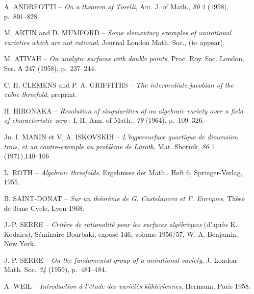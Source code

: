\documentclass[10pt]{article}
\begin{document}
\begin{enumerate}[label={\textup{[\arabic*]}},leftmargin=3.2em,labelsep=0.75em,itemsep=0.38em]
  \item A. ANDREOTTI -- \emph{On a theorem of Torelli}, Am. J. of Math., \emph{80} 4 (1958), p.~801--828.
  \item M. ARTIN and D. MUMFORD -- \emph{Some elementary examples of unirational varieties which are not rational}, Journal London Math. Soc., (to appear).
  \item M. ATIYAH -- \emph{On analytic surfaces with double points}, Proc. Roy. Soc. London, Ser. A 247 (1958), p.~237--244.
  \item C. H. CLEMENS and P. A. GRIFFITHS -- \emph{The intermediate jacobian of the cubic threefold}, preprint.
  \item H. HIRONAKA -- \emph{Resolution of singularities of an algebraic variety over a field of characteristic zero} : I, II, Ann. of Math., \emph{79} (1964), p.~109--326.
  \item Ju. I. MANIN et V. A. ISKOVSKIH -- \emph{L'hypersurface quartique de dimension trois, et un contre-exemple au problème de Lüroth}, Mat. Sbornik, \emph{86} 1 (1971),140--166
  \item L. ROTH -- \emph{Algebraic threefolds}, Ergebnisse der Math., Heft 6, Springer-Verlag, 1955.
  \item B. SAINT-DONAT -- \emph{Sur un théorème de G. Castelnuovo et F. Enriques}, Thèse de 3ème Cycle, Lyon 1968.
  \item J.-P. SERRE -- \emph{Critère de rationalité pour les surfaces algébriques} (d'après K. Kodaira), Séminaire Bourbaki, exposé 146, volume 1956/57, W. A. Benjamin, New York.
  \item J.-P. SERRE -- \emph{On the fundamental group of a unirational variety}, J. London Math. Soc. \emph{34} (1959), p.~481--484.
  \item A. WEIL -- \emph{Introduction à l'étude des variétés kählériennes}, Hermann, Paris 1958.
\end{enumerate}
\end{document}

